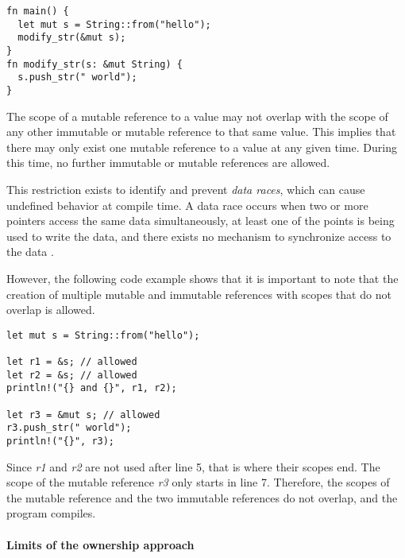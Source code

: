 \documentclass[sigplan,11pt,nonacm]{acmart}
\begin{document}
\begin{lstlisting}
fn main() {
  let mut s = String::from("hello");
  modify_str(&mut s);
}
fn modify_str(s: &mut String) {
  s.push_str(" world");
}
\end{lstlisting}

The scope of a mutable reference to a value may not overlap with the scope of any other immutable or mutable reference to that same value.
This implies that there may only exist one mutable reference to a value at any given time.
During this time, no further immutable or mutable references are allowed.

This restriction exists to identify and prevent \emph{data races}, which can cause undefined behavior at compile time.
A data race occurs when two or more pointers access the same data simultaneously, at least one of the points is being used to write the data, and there exists no mechanism to synchronize access to the data \cite{rust-book}.

However, the following code example \cite{rust-book} shows that it is important to note that the creation of multiple mutable and immutable references with scopes that do not overlap is allowed.

\begin{lstlisting}
let mut s = String::from("hello");

let r1 = &s; // allowed
let r2 = &s; // allowed
println!("{} and {}", r1, r2);

let r3 = &mut s; // allowed
r3.push_str(" world");
println!("{}", r3);
\end{lstlisting}

Since \emph{r1} and \emph{r2} are not used after line 5, that is where their scopes end.
The scope of the mutable reference \emph{r3} only starts in line 7.
Therefore, the scopes of the mutable reference and the two immutable references do not overlap, and the program compiles.


\paragraph{Limits of the ownership approach}


\end{document}
